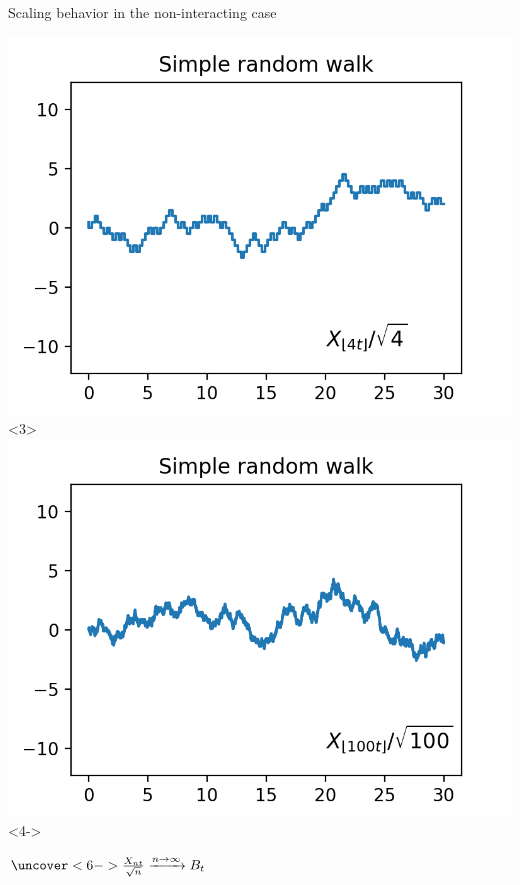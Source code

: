 \documentclass{if-beamer}
\begin{document}
\begin{frame}{Scaling behavior in the non-interacting case}
\begin{minipage}{0.45\textwidth}
            \includegraphics[width=\textwidth]{figures/srw_x3.png}<3>
            \includegraphics[width=\textwidth]{figures/srw_x4.png}<4->
        \end{minipage}
        \begin{math}
        \uncover<6->{\frac{X_{nt}}{\sqrt{n}} \xrightarrow{n \to \infty} B_t}
        \end{math}
        \begin{minipage}{0.45\textwidth}
            \centering

\end{minipage}
\end{frame}
\end{document}
